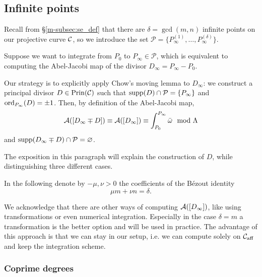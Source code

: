 \documentclass[main.tex]{subfiles}
\begin{document}
  
  
  \subsection{Infinite points}\label{subsec:ajm_infty}

  Recall from \S \ref{m-subsec:se_def} that there are $\delta = \gcd(m,n)$ infinite points on our projective curve $\mathcal{C}$, so
  we introduce the set $\mathcal{P}
  = \{ P_{\infty}^{(1)},\dots, P_{\infty}^{(\delta)} \}$.
  
  
  Suppose we want to integrate from $P_0$ to $P_{\infty} \in \mathcal{P}$, which is equivalent to computing the Abel-Jacobi map of the divisor
  $D_{\infty} = P_{\infty} - P_0$.

  Our strategy is to explicitly apply Chow's moving lemma to $D_{\infty}$: we construct a principal divisor $D \in \operatorname{Prin}(\mathcal{C})$ such that $\operatorname{supp}(D) \cap \mathcal{P} = \{ P_{\infty} \}$
  and $\operatorname{ord}_{P_{\infty}}(D) = \pm 1$. Then, by definition of the Abel-Jacobi map,
  \begin{equation}
  \mathcal{A}([D_{\infty} \mp D]) \equiv \mathcal{A}([D_{\infty}]) \equiv \int_{P_0}^{P_{\infty}} \bar{\omega} \mod \Lambda
  \end{equation}
  and $\operatorname{supp}(D_{\infty} \mp D) \cap \mathcal{P} = \varnothing$.
  
  The exposition in this paragraph will explain the construction of $D$, while distinguishing three different cases.
  
  In the following denote by  $-\mu,\nu > 0$ the coefficients of the Bézout identity
  \begin{equation}
    \mu m + \nu n = \delta.
  \end{equation}
  
  \begin{rmk}
   We acknowledge that there are other ways of computing $\mathcal{A}([D_{\infty}])$, like using transformations or even numerical
   integration. Especially in the case $\delta = m$ a transformation is the better option and will be used in practice.
   The advantage of this approach is that we can stay in our setup, i.e. we can compute solely on $\mathcal{C}_{\text{aff}}$ and
   keep the integration scheme.
  \end{rmk}

  
  
  \subsubsection{Coprime degrees}\label{subsec:ajm_inf_cop}
  
\end{document}
